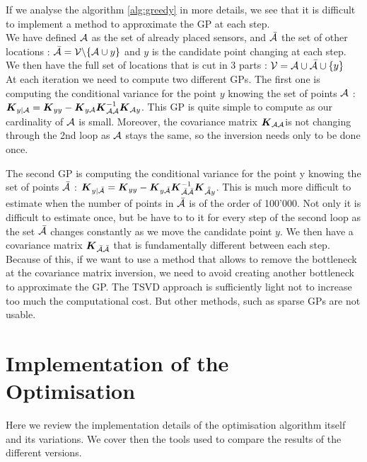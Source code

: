 If we analyse the algorithm \ref{alg:greedy} in more details, we see that it is difficult to implement a method to approximate the GP at each step. \\

We have defined $\mathcal{A}$ as the set of already placed sensors, and $\bar{\mathcal{A}}$ the set of other locations : $\bar{\mathcal{A}} = \mathcal{V} \backslash \{\mathcal{A} \cup y\} $ and $y$ is the candidate point changing at each step. We then have the full set of locations that is cut in 3 parts : $ \mathcal{V} = \mathcal{A} \cup \bar{\mathcal{A}} \cup \{y\} $ \\

At each iteration we need to compute two different GPs. The first one is computing the conditional variance for the point $y$ knowing the set of points $\mathcal{A}$ :   ${\boldsymbol{{K}}}_{y | \mathcal{A}} =  {\boldsymbol{{K}}}_{yy} - {\boldsymbol{{K}}}_{y\mathcal{A}} {\boldsymbol{{K}}}_{\mathcal{A}\mathcal{A}}^{-1} {\boldsymbol{{K}}}_{\mathcal{A} y} $. This GP is quite simple to compute as our cardinality of $\mathcal{A}$ is small. Moreover, the covariance matrix  ${\boldsymbol{{K}}}_{\mathcal{A}\mathcal{A}}$is not changing through the 2nd loop as $\mathcal{A}$ stays the same, so the inversion needs only to be done once. 

The second GP is computing the conditional variance for the point y knowing the set of points $\bar{\mathcal{A}}$ : ${\boldsymbol{{K}}}_{y | \bar{\mathcal{A}}} =  {\boldsymbol{{K}}}_{yy} - {\boldsymbol{{K}}}_{y\bar{\mathcal{A}}} {\boldsymbol{{K}}}_{\bar{\mathcal{A}}\bar{\mathcal{A}}}^{-1} {\boldsymbol{{K}}}_{\bar{\bar{\mathcal{A}}} y} $. This is much more difficult to estimate when the number of points in $\bar{\mathcal{A}}$ is of the order of 100’000. Not only it is difficult to estimate once, but be have to to it for every step of the second loop as the set $\bar{\mathcal{A}}$ changes constantly as we move the candidate point $y$. We then have a covariance matrix ${\boldsymbol{{K}}}_{\bar{\mathcal{A}}\bar{\mathcal{A}}}$ that is fundamentally different between each step. \\

Because of this, if we want to use a method that allows to remove the bottleneck at the covariance matrix inversion, we need to avoid creating another bottleneck to approximate the GP. The TSVD approach is sufficiently light not to increase too much the computational cost. But other methods, such as sparse GPs are not usable. 



\section{Implementation of the Optimisation}

Here we review the implementation details of the optimisation algorithm itself and its variations. We cover then the tools used to compare the results of the different versions.  


